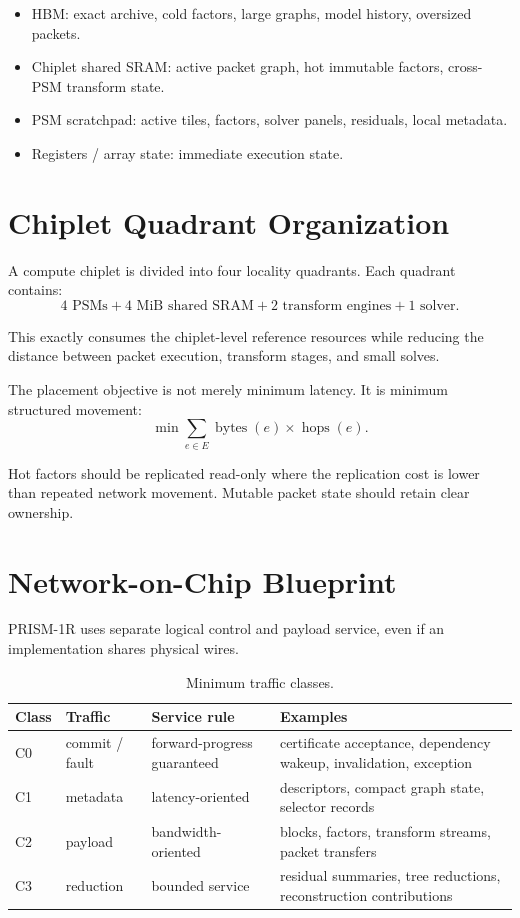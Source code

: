 \documentclass[10pt,letterpaper]{article}
\begin{document}
\begin{itemize}
\item HBM: exact archive, cold factors, large graphs, model history, oversized packets.
\item Chiplet shared SRAM: active packet graph, hot immutable factors, cross-PSM transform state.
\item PSM scratchpad: active tiles, factors, solver panels, residuals, local metadata.
\item Registers / array state: immediate execution state.
\end{itemize}

\section{Chiplet Quadrant Organization}

A compute chiplet is divided into four locality quadrants. Each quadrant contains:
\[
\boxed{4\text{ PSMs}+4\text{ MiB shared SRAM}+2\text{ transform engines}+1\text{ solver}.}
\]

This exactly consumes the chiplet-level reference resources while reducing the distance between packet execution, transform stages, and small solves.

The placement objective is not merely minimum latency. It is minimum structured movement:
\[
\min \sum_{e\in E} \operatorname{bytes}(e)\times\operatorname{hops}(e).
\]

Hot factors should be replicated read-only where the replication cost is lower than repeated network movement. Mutable packet state should retain clear ownership.

\section{Network-on-Chip Blueprint}

PRISM-1R uses separate logical control and payload service, even if an implementation shares physical wires.

\begin{table}[h]
\centering
\caption{Minimum traffic classes.}
\begin{tabularx}{0.97\linewidth}{p{0.55in}p{1.55in}X X}
\toprule
\textbf{Class} & \textbf{Traffic} & \textbf{Service rule} & \textbf{Examples}\\
\midrule
C0 & commit / fault & forward-progress guaranteed & certificate acceptance, dependency wakeup, invalidation, exception\\
C1 & metadata & latency-oriented & descriptors, compact graph state, selector records\\
C2 & payload & bandwidth-oriented & blocks, factors, transform streams, packet transfers\\
C3 & reduction & bounded service & residual summaries, tree reductions, reconstruction contributions\\
\bottomrule
\end{tabularx}
\end{table}
\end{document}
